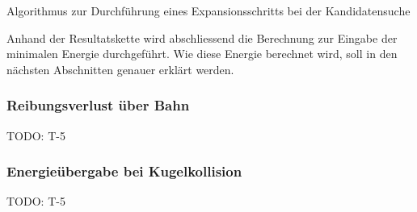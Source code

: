 \begin{algorithm}[H]
    \DontPrintSemicolon
    \caption{Algorithmus zur Durchführung eines Expansionsschritts bei der Kandidatensuche}
    \label{alg:backward_search}
\end{algorithm}

Anhand der Resultatskette wird abschliessend die Berechnung zur Eingabe der minimalen Energie durchgeführt.
Wie diese Energie berechnet wird, soll in den nächsten Abschnitten genauer erklärt werden.

\subsubsection{Reibungsverlust über Bahn}
TODO: T-5

\subsubsection{Energieübergabe bei Kugelkollision}
TODO: T-5

